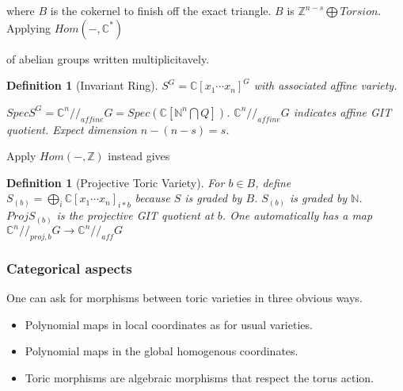 \documentclass[11pt]{book}
\theoremstyle{change}
\newtheorem{definition}[equation]{Definition}
\theoremstyle{nonumberplain}
\numberwithin{equation}{section}
\begin{document}
where $B$ is the cokernel to finish off the exact triangle. $B$ is $\mathbb{Z}^{n-s} \bigoplus Torsion$. Applying $Hom (-,\mathbb{C}^*)$

\begin{center}
\end{center}

of abelian groups written multiplicitavely.

\begin{definition}[Invariant Ring]
$S^G = \mathbb{C}[x_1 \cdots x_n]^G$ with associated affine variety.

$Spec S^G = \mathbb{C}^n //_{affine} G = Spec (\mathbb{C}[\mathbb{N}^n \bigcap Q])$. $\mathbb{C}^n //_{affine} G$ indicates affine GIT quotient. Expect dimension $n-(n-s)=s$.
\end{definition}

Apply $Hom (- , \mathbb{Z})$ instead gives

\begin{center}
\end{center}

\begin{definition}[Projective Toric Variety]
For $b \in B$, define $S_{(b)} = \bigoplus_i \mathbb{C}[x_1 \cdots x_n]_{i*b}$ because $S$ is graded by $B$. $S_{(b)}$ is graded by $\mathbb{N}$. $Proj S_{(b)}$ is the projective GIT quotient at $b$. One automatically has a map $\mathbb{C}^n //_{proj,b} G \to \mathbb{C}^n //_{aff} G$
\end{definition}

\subsubsection{Categorical aspects}

One can ask for morphisms between toric varieties in three obvious ways.

\begin{itemize}
\setlength\itemsep{-1em}
\item Polynomial maps in local coordinates as for usual varieties.\\
\item Polynomial maps in the global homogenous coordinates.\\
\item Toric morphisms are algebraic morphisms that respect the torus action.\\
\end{itemize}
\end{document}

